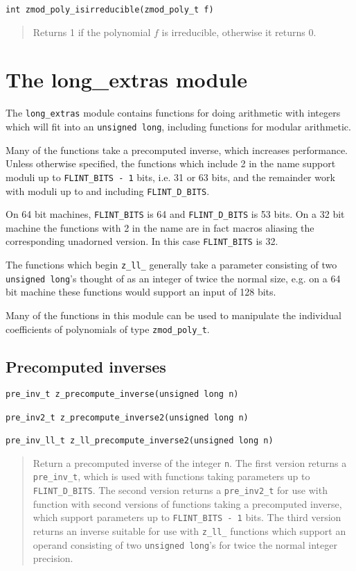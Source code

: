 \documentclass[a4paper,10pt]{article}
\newcommand{\code}{\lstinline}
\begin{document}
\begin{lstlisting}
int zmod_poly_isirreducible(zmod_poly_t f) 
\end{lstlisting}
\begin{quote}
Returns 1 if the polynomial $f$ is irreducible, otherwise it returns 0.
\end{quote}

\section{The long\_extras module}
The \code{long_extras} module contains functions for doing arithmetic with integers which will fit into an \code{unsigned long}, including functions for modular arithmetic.

Many of the functions take a precomputed inverse, which increases performance. Unless otherwise specified, the functions which include 2 in the name support moduli up to \code{FLINT_BITS - 1} bits, i.e. 31 or 63 bits, and the remainder work with moduli up to and including \code{FLINT_D_BITS}. 

On 64 bit machines, \code{FLINT_BITS} is 64 and \code{FLINT_D_BITS} is 53 bits. On a 32 bit machine the functions with 2 in the name are in fact macros aliasing the corresponding unadorned version. In this case \code{FLINT_BITS} is 32.

The functions which begin \code{z_ll_} generally take a parameter consisting of two \code{unsigned long}'s thought of as an integer of twice the normal size, e.g. on a 64 bit machine these functions would support an input of 128 bits.

Many of the functions in this module can be used to manipulate the individual coefficients of polynomials of type \code{zmod_poly_t}.

\subsection{Precomputed inverses}

\begin{lstlisting}
pre_inv_t z_precompute_inverse(unsigned long n)

pre_inv2_t z_precompute_inverse2(unsigned long n)

pre_inv_ll_t z_ll_precompute_inverse2(unsigned long n)
\end{lstlisting}
\begin{quote}
Return a precomputed inverse of the integer \code{n}. The first version returns a \code{pre_inv_t}, which is used with functions taking parameters up to \code{FLINT_D_BITS}. The second version returns a \code{pre_inv2_t} for use with function with second versions of functions taking a precomputed inverse, which support parameters up to \code{FLINT_BITS - 1} bits. The third version returns an inverse suitable for use with \code{z_ll_} functions which support an operand consisting of two \code{unsigned long}'s for twice the normal integer precision.
\end{quote}
\end{document}
